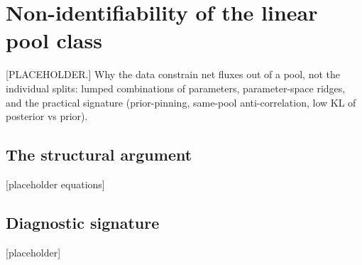 \documentclass[../HIKET_draft_v1.tex]{subfiles}
\begin{document}
\section{Non-identifiability of the linear pool class}
\label{app:nonident}

[PLACEHOLDER.] Why the data constrain net fluxes out of a pool, not the individual
splits: lumped combinations of parameters, parameter-space ridges, and the
practical signature (prior-pinning, same-pool anti-correlation, low KL of
posterior vs prior).

\subsection{The structural argument}
[placeholder equations]

\subsection{Diagnostic signature}
[placeholder]
\end{document}
